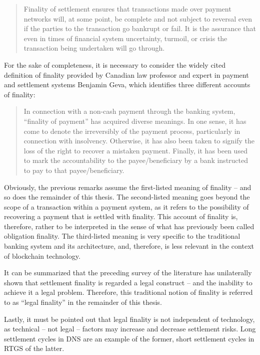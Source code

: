\begin{quote}
	Finality of settlement ensures that transactions made over payment networks will, at some point, be complete and not subject to reversal even if the parties to the transaction go bankrupt or fail.
	It is the assurance that even in times of financial system uncertainty, turmoil, or crisis the transaction being undertaken will go through.
\end{quote}

For the sake of completeness, it is necessary to consider the widely cited definition of finality provided by Canadian law professor and expert in payment and settlement systems Benjamin Geva, which identifies three different accounts of finality: \autocite[633, 634]{geva2008}

\begin{quote}
	In connection with a non-cash payment through the banking system, ``finality of payment'' has acquired diverse meanings.
	In one sense, it has come to denote the irreversibly of the payment process, particularly in connection with insolvency.
	Otherwise, it has also been taken to signify the loss of the right to recover a mistaken payment.
	Finally, it has been used to mark the accountability to the payee/beneficiary by a bank instructed to pay to that payee/beneficiary. 
\end{quote}

Obviously, the previous remarks assume the first-listed meaning of finality -- and so does the remainder of this thesis.
The second-listed meaning goes beyond the scope of a transaction within a payment system, as it refers to the possibility of recovering a payment that is settled with finality.
This account of finality is, therefore, rather to be interpreted in the sense of what has previously been called obligation finality.
The third-listed meaning is very specific to the traditional banking system and its architecture, and, therefore, is less relevant in the context of blockchain technology.

It can be summarized that the preceding survey of the literature has unilaterally shown that settlement finality is regarded a legal construct -- and the inability to achieve it a legal problem.
Therefore, this traditional notion of finality is referred to as ``legal finality'' in the remainder of this thesis.

Lastly, it must be pointed out that legal finality is not independent of technology, as technical -- not legal -- factors may increase and decrease settlement risks.
Long settlement cycles in DNS are an example of the former, short settlement cycles in RTGS of the latter.
